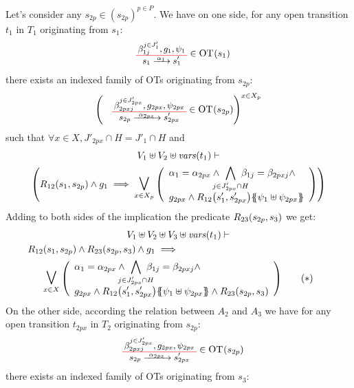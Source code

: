 \documentclass[runningheads]{llncs}
\begin{document}
\begin{enumerate}
Let's consider any $s_{2p} \in (s_{2p})^{p\in P}$. We have on one side,  for any open transition $t_1$ in $T_1$  originating from $s_1$:
\begin{align*}
\OTx{1}{}{1}{1} \in \fOT{s_1}
\end{align*}
there exists an indexed family of OTs originating from $s_{2p}$: 
\begin{align*}
\mpar{\OTx{2p}{x}{2px}{2px} \in \fOT{s_{2p}}}^{x \in X_p} 
\end{align*}
such that $\forall x \in X, J'_{2px} \cap H = J'_1 \cap H$ and
\begin{multline*}
V_1 \uplus V_2 \uplus \fvars{t_1} \vdash\\ \mpar{R_{12}\mpar{s_1, s_{2p}} \wedge g_1 \implies \operatorname*{\bigsymb{\bigvee}}_{x \in X_p} \mpar{\everymath{\displaystyle}
\begin{array}{l}
			\alpha_1 = \alpha_{2px} \wedge \bigwedge_\subbox{j \in J'_{2px} \cap H} \beta_{1j} = \beta_{2pxj} \nwedge\\
			 g_{2px} \wedge R_{12}\mpar{s'_1, s'_{2px}}\psubst{\psi_1 \uplus \psi_{2px}}
		\end{array}}} 
\end{multline*}		
Adding to both sides of the implication the predicate $R_{23}{\left(s_{2p},s_3\right)}$ we get: 
\begin{multline*}
V_1 \uplus V_2 \uplus V_3  \uplus \fvars{t_1} \vdash\\
R_{12}\mpar{s_1, s_{2p}} \wedge R_{23}\mpar{s_{2p},s_3} \wedge g_1 \implies\hspace{5.5cm}\\ \operatorname*{\bigsymb{\bigvee}}_{x \in X} \mpar{\everymath{\displaystyle}
\begin{array}{l}
			\alpha_1 = \alpha_{2px} \wedge \bigwedge_\subbox{j \in J'_{2px} \cap H} \beta_{1j} = \beta_{2pxj} \land\\
			 g_{2px} \wedge R_{12}\mpar{s'_1, s'_{2px}}\psubst{\psi_1 \uplus \psi_{2px}} \land R_{23}\mpar{s_{2p},s_3}
		\end{array}} \qquad (*) 
\end{multline*}	
On the other side, according the relation between $A_2$ and $A_3$ we have for any open transition $t_{2px}$ in $T_2$ originating from $s_{2p}$:
\begin{align*}
\OTx{2p}{x}{2px}{2px} \in \fOT{s_{2p}}
\end{align*}
there exists an indexed family of OTs originating from $s_3$: 
\begin{align*}

\end{align*}
\end{enumerate}
\end{document}
